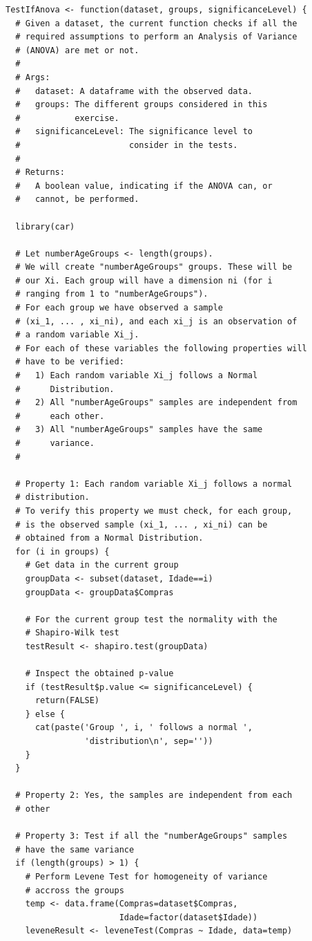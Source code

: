 \documentclass[12pt]{article}
\begin{document}
\begin{lstlisting}
TestIfAnova <- function(dataset, groups, significanceLevel) {
  # Given a dataset, the current function checks if all the
  # required assumptions to perform an Analysis of Variance
  # (ANOVA) are met or not.
  #
  # Args:
  #   dataset: A dataframe with the observed data.
  #   groups: The different groups considered in this
  #           exercise.
  #   significanceLevel: The significance level to
  #                      consider in the tests.
  #
  # Returns:
  #   A boolean value, indicating if the ANOVA can, or
  #   cannot, be performed.

  library(car)

  # Let numberAgeGroups <- length(groups).
  # We will create "numberAgeGroups" groups. These will be
  # our Xi. Each group will have a dimension ni (for i
  # ranging from 1 to "numberAgeGroups").
  # For each group we have observed a sample
  # (xi_1, ... , xi_ni), and each xi_j is an observation of
  # a random variable Xi_j.
  # For each of these variables the following properties will
  # have to be verified:
  #   1) Each random variable Xi_j follows a Normal
  #      Distribution.
  #   2) All "numberAgeGroups" samples are independent from
  #      each other.
  #   3) All "numberAgeGroups" samples have the same
  #      variance.
  #

  # Property 1: Each random variable Xi_j follows a normal
  # distribution.
  # To verify this property we must check, for each group,
  # is the observed sample (xi_1, ... , xi_ni) can be
  # obtained from a Normal Distribution.
  for (i in groups) {
    # Get data in the current group
    groupData <- subset(dataset, Idade==i)
    groupData <- groupData$Compras

    # For the current group test the normality with the
    # Shapiro-Wilk test
    testResult <- shapiro.test(groupData)

    # Inspect the obtained p-value
    if (testResult$p.value <= significanceLevel) {
      return(FALSE)
    } else {
      cat(paste('Group ', i, ' follows a normal ',
                'distribution\n', sep=''))
    }
  }

  # Property 2: Yes, the samples are independent from each
  # other

  # Property 3: Test if all the "numberAgeGroups" samples
  # have the same variance
  if (length(groups) > 1) {
    # Perform Levene Test for homogeneity of variance
    # accross the groups
    temp <- data.frame(Compras=dataset$Compras,
                       Idade=factor(dataset$Idade))
    leveneResult <- leveneTest(Compras ~ Idade, data=temp)


\end{lstlisting}
\end{document}
